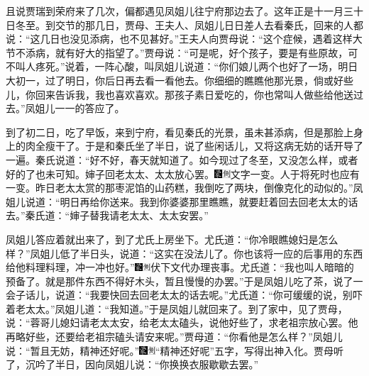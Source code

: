 且说贾瑞到荣府来了几次，偏都遇见凤姐儿往宁府那边去了。这年正是十一月三十日冬至。到交节的那几日，贾母、王夫人、凤姐儿日日差人去看秦氏，回来的人都说：``这几日也没见添病，也不见甚好。''王夫人向贾母说：``这个症候，遇着这样大节不添病，就有好大的指望了。''贾母说：``可是呢，好个孩子，要是有些原故，可不叫人疼死。''说着，一阵心酸，叫凤姐儿说道：``你们娘儿两个也好了一场，明日大初一，过了明日，你后日再去看一看他去。你细细的瞧瞧他那光景，倘或好些儿，你回来告诉我，我也喜欢喜欢。那孩子素日爱吃的，你也常叫人做些给他送过去。''凤姐儿一一的答应了。

到了初二日，吃了早饭，来到宁府，看见秦氏的光景，虽未甚添病，但是那脸上身上的肉全瘦干了。于是和秦氏坐了半日，说了些闲话儿，又将这病无妨的话开导了一遍。秦氏说道：``好不好，春天就知道了。如今现过了冬至，又没怎么样，或者好的了也未可知。婶子回老太太、太太放心罢。{\includegraphics[width=3mm]{../Images/00006}\includegraphics[width=3mm]{../Images/00011}\footnotesize \kaishu 文字一变。人于将死时也应有一变。}昨日老太太赏的那枣泥馅的山药糕，我倒吃了两块，倒像克化的动似的。''凤姐儿说道：``明日再给你送来。我到你婆婆那里瞧瞧，就要赶着回去回老太太的话去。''秦氏道：``婶子替我请老太太、太太安罢。''

凤姐儿答应着就出来了，到了尤氏上房坐下。尤氏道：``你冷眼瞧媳妇是怎么样？''凤姐儿低了半日头，说道：``这实在没法儿了。你也该将一应的后事用的东西给他料理料理，冲一冲也好。''{\includegraphics[width=3mm]{../Images/00006}\includegraphics[width=3mm]{../Images/00011}\footnotesize \kaishu 伏下文代办理丧事。}尤氏道：``我也叫人暗暗的预备了。就是那件东西不得好木头，暂且慢慢的办罢。''于是凤姐儿吃了茶，说了一会子话儿，说道：``我要快回去回老太太的话去呢。''尤氏道：``你可缓缓的说，别吓着老太太。''凤姐儿道：``我知道。''于是凤姐儿就回来了。到了家中，见了贾母，说：``蓉哥儿媳妇请老太太安，给老太太磕头，说他好些了，求老祖宗放心罢。他再略好些，还要给老祖宗磕头请安来呢。''贾母道：``你看他是怎么样？''凤姐儿说：``暂且无妨，精神还好呢。''{\includegraphics[width=3mm]{../Images/00006}\includegraphics[width=3mm]{../Images/00011}\footnotesize \kaishu ``精神还好呢''五字，写得出神入化。}贾母听了，沉吟了半日，因向凤姐儿说：``你换换衣服歇歇去罢。''

